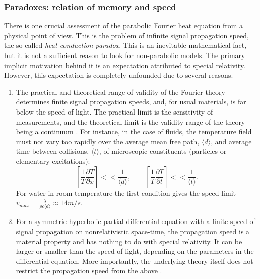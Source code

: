 \documentclass[sn-mathphys]{sn-jnl}%
\theoremstyle{thmstyleone}%
\theoremstyle{thmstyletwo}%
\theoremstyle{thmstylethree}%
\begin{document}
{\subsubsection{Paradoxes: relation of memory and speed}
There is one crucial assessment of the parabolic Fourier heat equation from a physical point of view. This is the problem of infinite signal propagation speed, the so-called \emph{heat conduction paradox}. This is an inevitable mathematical fact, but it is not a sufficient reason to look for non-parabolic models. The primary implicit motivation behind it is an expectation attributed to special relativity. However, this expectation is completely unfounded due to several reasons.
\begin{enumerate}
	\item The practical and theoretical range of validity of the Fourier theory determines finite signal propagation speeds, and, for usual materials, is far below the speed of light. The practical limit is the sensitivity of measurements, and the theoretical limit is the validity range of the theory being a continuum \cite{Wey67a,Fic92a,KosLiu00a}. For instance, in the case of fluids, the temperature field must not vary too rapidly over the average mean free path, $\langle d\rangle$, and average time between collisions, $\langle t\rangle$, of microscopic constituents (particles or elementary excitations):
	$$
	\left[\frac{1}{T}\frac{\partial T}{\partial x} \right] << \frac{1}{\langle d\rangle}, \qquad
	\left[\frac{1}{T}\frac{\partial T}{\partial t} \right] << \frac{1}{\langle t\rangle}.
	$$
	For water in room temperature the first condition gives the speed limit $v_{max} = \frac{\lambda}{\rho c \langle d\rangle} \approx 14 m/s$.
	\item 
	For a symmetric hyperbolic partial differential equation with a finite speed of signal propagation on nonrelativistic space-time, the propagation speed is a material property and has nothing to do with special relativity. It can be larger or smaller than the speed of light, depending on the parameters in the differential equation. More importantly, the underlying theory itself does not restrict the propagation speed from the above {\cite{KosLiu00a,VanBir08a}}.
\end{enumerate}

}
\end{document}
